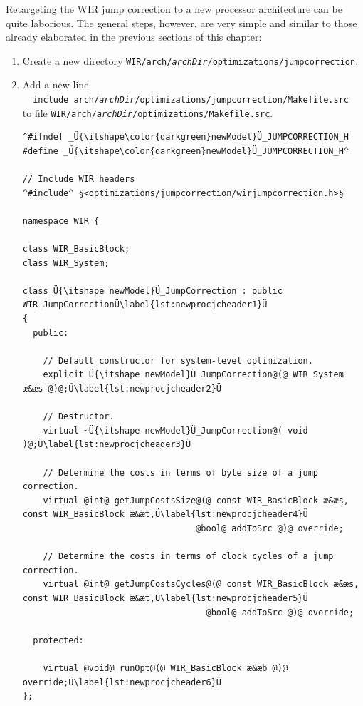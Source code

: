 Retargeting the \gls{WIR} jump correction to a new processor architecture can be quite laborious.
The general steps, however, are very simple and similar to those already elaborated in the previous sections of this chapter:
\begin{enumerate}
  \item Create a new directory \texttt{WIR/arch/{\itshape archDir}/optimizations/jumpcorrection}.

  \item Add a new line \\
  \verb|  include arch/|\texttt{\itshape archDir}\verb|/optimizations/jumpcorrection/Makefile.src| \\
  to file \texttt{WIR/arch/{\itshape archDir}/optimizations/Makefile.src}.

\begin{lstlisting}[style=code,float=!t,caption={Header File for a New Processor Model's Jump Correction},label=lst:newprocjcheader]
^#ifndef _Ü{\itshape\color{darkgreen}newModel}Ü_JUMPCORRECTION_H
#define _Ü{\itshape\color{darkgreen}newModel}Ü_JUMPCORRECTION_H^

// Include WIR headers
^#include^ §<optimizations/jumpcorrection/wirjumpcorrection.h>§

namespace WIR {

class WIR_BasicBlock;
class WIR_System;

class Ü{\itshape newModel}Ü_JumpCorrection : public WIR_JumpCorrectionÜ\label{lst:newprocjcheader1}Ü
{
  public:

    // Default constructor for system-level optimization.
    explicit Ü{\itshape newModel}Ü_JumpCorrection@(@ WIR_System æ&æs @)@;Ü\label{lst:newprocjcheader2}Ü

    // Destructor.
    virtual ~Ü{\itshape newModel}Ü_JumpCorrection@( void )@;Ü\label{lst:newprocjcheader3}Ü

    // Determine the costs in terms of byte size of a jump correction.
    virtual @int@ getJumpCostsSize@(@ const WIR_BasicBlock æ&æs, const WIR_BasicBlock æ&æt,Ü\label{lst:newprocjcheader4}Ü
                                  @bool@ addToSrc @)@ override;

    // Determine the costs in terms of clock cycles of a jump correction.
    virtual @int@ getJumpCostsCycles@(@ const WIR_BasicBlock æ&æs, const WIR_BasicBlock æ&æt,Ü\label{lst:newprocjcheader5}Ü
                                    @bool@ addToSrc @)@ override;

  protected:

    virtual @void@ runOpt@(@ WIR_BasicBlock æ&æb @)@ override;Ü\label{lst:newprocjcheader6}Ü
};


\end{lstlisting}
\end{enumerate}
